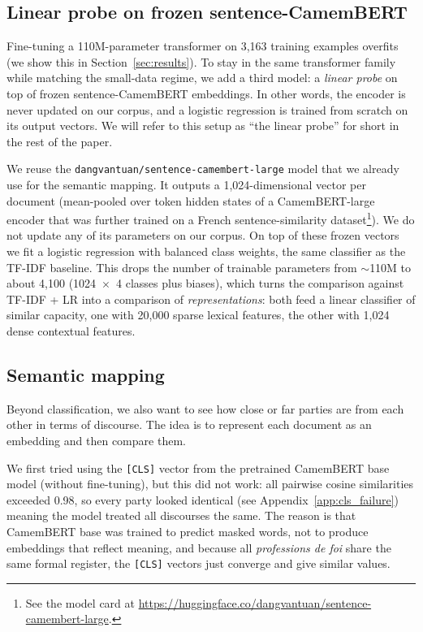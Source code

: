 \documentclass{article}
\begin{document}
\subsection{Linear probe on frozen sentence-CamemBERT}
\label{sec:frozen}

Fine-tuning a 110M-parameter transformer on 3{,}163 training examples overfits (we show this in Section~\ref{sec:results}). To stay in the same transformer family while matching the small-data regime, we add a third model: a \emph{linear probe} on top of frozen sentence-CamemBERT embeddings. In other words, the encoder is never updated on our corpus, and a logistic regression is trained from scratch on its output vectors. We will refer to this setup as ``the linear probe'' for short in the rest of the paper.

We reuse the \texttt{dangvantuan/sentence-camembert-large} model that we already use for the semantic mapping. It outputs a 1{,}024-dimensional vector per document (mean-pooled over token hidden states of a CamemBERT-large encoder that was further trained on a French sentence-similarity dataset\footnote{See the model card at \url{https://huggingface.co/dangvantuan/sentence-camembert-large}.}). We do not update any of its parameters on our corpus. On top of these frozen vectors we fit a logistic regression with balanced class weights, the same classifier as the TF-IDF baseline. This drops the number of trainable parameters from $\sim$110M to about 4{,}100 (1024~$\times$~4 classes plus biases), which turns the comparison against TF-IDF + LR into a comparison of \emph{representations}: both feed a linear classifier of similar capacity, one with 20{,}000 sparse lexical features, the other with 1{,}024 dense contextual features.

\subsection{Semantic mapping}

Beyond classification, we also want to see how close or far parties are from each other in terms of discourse. The idea is to represent each document as an embedding and then compare them.

We first tried using the \texttt{[CLS]} vector from the pretrained CamemBERT base model (without fine-tuning), but this did not work: all pairwise cosine similarities exceeded 0.98, so every party looked identical (see Appendix~\ref{app:cls_failure}) meaning the model treated all discourses the same. The reason is that CamemBERT base was trained to predict masked words, not to produce embeddings that reflect meaning, and because all \textit{professions de foi} share the same formal register, the \texttt{[CLS]} vectors just converge and give similar values.
\end{document}
